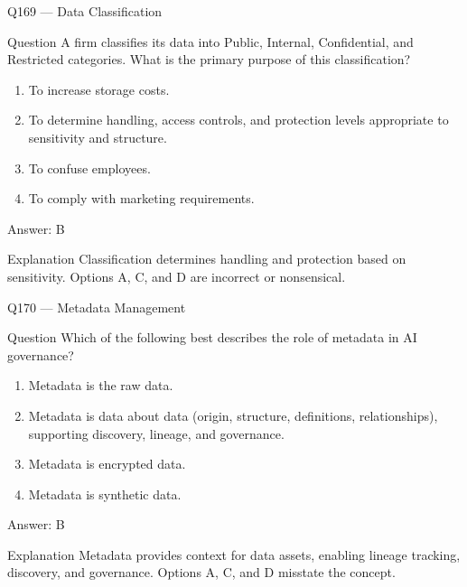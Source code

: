 \documentclass[aspectratio=169,8pt]{beamer}
\begin{document}
\begin{frame}{Q169 --- Data Classification}
\begin{block}{Question}
A firm classifies its data into Public, Internal, Confidential, and Restricted categories. What is the primary purpose of this classification?
\begin{enumerate}
\item To increase storage costs.
\item To determine handling, access controls, and protection levels appropriate to sensitivity and structure.
\item To confuse employees.
\item To comply with marketing requirements.
\end{enumerate}  \end{block}
\begin{exampleblock}{Answer: B}\end{exampleblock}
\begin{block}{Explanation}
Classification determines handling and protection based on sensitivity. Options A, C, and D are incorrect or nonsensical.
\end{block}
\end{frame}

\begin{frame}{Q170 --- Metadata Management}
\begin{block}{Question}
Which of the following best describes the role of metadata in AI governance?
\begin{enumerate}
\item Metadata is the raw data.
\item Metadata is data about data (origin, structure, definitions, relationships), supporting discovery, lineage, and governance.
\item Metadata is encrypted data.
\item Metadata is synthetic data.
\end{enumerate}  \end{block}
\begin{exampleblock}{Answer: B}\end{exampleblock}
\begin{block}{Explanation}
Metadata provides context for data assets, enabling lineage tracking, discovery, and governance. Options A, C, and D misstate the concept.
\end{block}
\end{frame}
\end{document}
